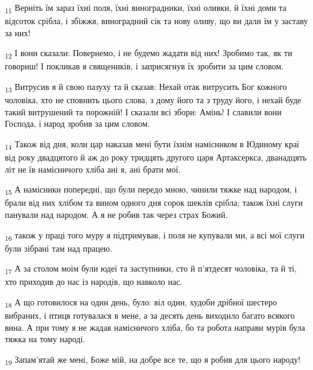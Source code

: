 \begin{tcolorbox}
\textsubscript{11} Верніть їм зараз їхні поля, їхні виноградники, їхні оливки, й їхні доми та відсоток срібла, і збіжжя, виноградний сік та нову оливу, що ви дали їм у заставу за них!
\end{tcolorbox}
\begin{tcolorbox}
\textsubscript{12} І вони сказали: Повернемо, і не будемо жадати від них! Зробимо так, як ти говориш! І покликав я священиків, і заприсягнув їх зробити за цим словом.
\end{tcolorbox}
\begin{tcolorbox}
\textsubscript{13} Витрусив я й свою пазуху та й сказав: Нехай отак витрусить Бог кожного чоловіка, хто не сповнить цього слова, з дому його та з труду його, і нехай буде такий витрушений та порожній! І сказали всі збори: Амінь! І славили вони Господа, і народ зробив за цим словом.
\end{tcolorbox}
\begin{tcolorbox}
\textsubscript{14} Також від дня, коли цар наказав мені бути їхнім намісником в Юдиному краї від року двадцятого й аж до року тридцять другого царя Артаксеркса, дванадцять літ не їв намісничого хліба ані я, ані брати мої.
\end{tcolorbox}
\begin{tcolorbox}
\textsubscript{15} А намісники попередні, що були передо мною, чинили тяжке над народом, і брали від них хлібом та вином одного дня сорок шеклів срібла; також їхні слуги панували над народом. А я не робив так через страх Божий.
\end{tcolorbox}
\begin{tcolorbox}
\textsubscript{16} також у праці того муру я підтримував, і поля не купували ми, а всі мої слуги були зібрані там над працею.
\end{tcolorbox}
\begin{tcolorbox}
\textsubscript{17} А за столом моїм були юдеї та заступники, сто й п'ятдесят чоловіка, та й ті, хто приходив до нас із народів, що навколо нас.
\end{tcolorbox}
\begin{tcolorbox}
\textsubscript{18} А що готовилося на один день, було: віл один, худоби дрібної шестеро вибраних, і птиця готувалася в мене, а за десять день виходило багато всякого вина. А при тому я не жадав намісничого хліба, бо та робота направи мурів була тяжка на тому народі.
\end{tcolorbox}
\begin{tcolorbox}
\textsubscript{19} Запам'ятай же мені, Боже мій, на добре все те, що я робив для цього народу!
\end{tcolorbox}
